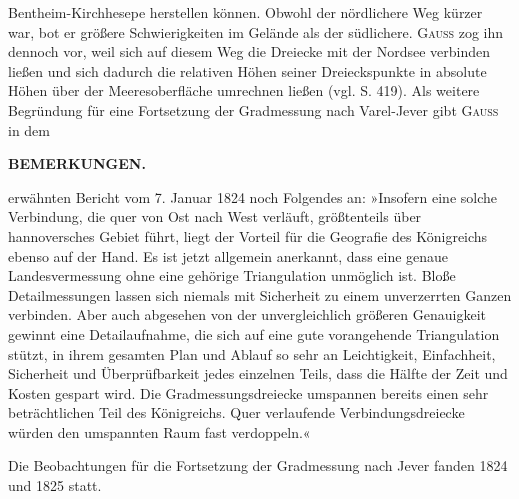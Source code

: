 Bentheim-Kirchhesepe herstellen können. Obwohl der nördlichere Weg kürzer war, bot er größere Schwierigkeiten im Gelände als der südlichere. \textsc{Gauss} zog ihn dennoch vor, weil sich auf diesem Weg die Dreiecke mit der Nordsee verbinden ließen und sich dadurch die relativen Höhen seiner Dreieckspunkte in absolute Höhen über der Meeresoberfläche umrechnen ließen (vgl. S. 419). Als weitere Begründung für eine Fortsetzung der Gradmessung nach Varel-Jever gibt \textsc{Gauss} in dem
\par\clearpage
\noindent{}\hfill\textbf{BEMERKUNGEN.}\hfill\null\par\medskip
\noindent erwähnten Bericht vom 7. Januar 1824 noch Folgendes an: »Insofern eine solche Verbindung, die quer von Ost nach West verläuft, größtenteils über hannoversches Gebiet führt, liegt der Vorteil für die Geografie des Königreichs ebenso auf der Hand. Es ist jetzt allgemein anerkannt, dass eine genaue Landesvermessung ohne eine gehörige Triangulation unmöglich ist. Bloße Detailmessungen lassen sich niemals mit Sicherheit zu einem unverzerrten Ganzen verbinden. Aber auch abgesehen von der unvergleichlich größeren Genauigkeit gewinnt eine Detailaufnahme, die sich auf eine gute vorangehende Triangulation stützt, in ihrem gesamten Plan und Ablauf so sehr an Leichtigkeit, Einfachheit, Sicherheit und Überprüfbarkeit jedes einzelnen Teils, dass die Hälfte der Zeit und Kosten gespart wird. Die Gradmessungsdreiecke umspannen bereits einen sehr beträchtlichen Teil des Königreichs. Quer verlaufende Verbindungsdreiecke würden den umspannten Raum fast verdoppeln.«

\par\noindent\hspace*{\parindent}Die Beobachtungen für die Fortsetzung der Gradmessung nach Jever fanden 1824 und 1825 statt.

